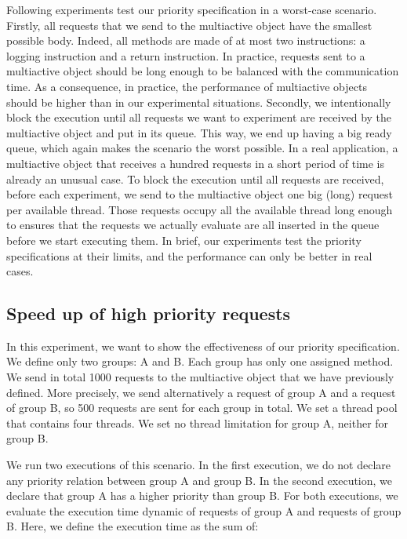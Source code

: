\documentclass[11pt]{report}
\begin{document}
Following experiments test our priority specification in a worst-case scenario. Firstly, all requests that we send to the multiactive object have the smallest possible body. Indeed, all methods are made of at most two instructions: a logging instruction and a return instruction.
In practice, requests sent to a multiactive object should be long enough to be balanced with the communication time. As a consequence, in practice, the performance of multiactive objects should be higher than in our experimental situations.
Secondly, we intentionally block the execution until all requests we want to experiment are received by the multiactive object and put in its queue. This way, we end up having a big ready queue, which again makes the scenario the worst possible. In a real application, a multiactive object that receives a hundred requests in a short period of time is already an unusual case. To block the execution until all requests are received, before each experiment, we send to the multiactive object one big (long) request per available thread. Those requests occupy all the available thread long enough to ensures that the requests we actually evaluate are all inserted in the queue before we start executing them.
In brief, our experiments test the priority specifications at their limits, and the performance can only be better in real cases.



\subsection{Speed up of high priority requests}
In this experiment, we want to show the effectiveness of our priority specification. We define only two groups: A and B. Each group has only one assigned method. We send in total 1000 requests to the multiactive object that we have previously defined. More precisely, we send alternatively a request of group A and a request of group B, so 500 requests are sent for each group in total. We set a thread pool that contains four threads. We set no thread limitation for group A, neither for group B.

We run two executions of this scenario. In the first execution, we do not declare any priority relation between group A and group B. In the second execution, we declare that group A has a higher priority than group B. For both executions, we evaluate the execution time dynamic of requests of group A and requests of group B. Here, we define the execution time as the sum of:
\end{document}
